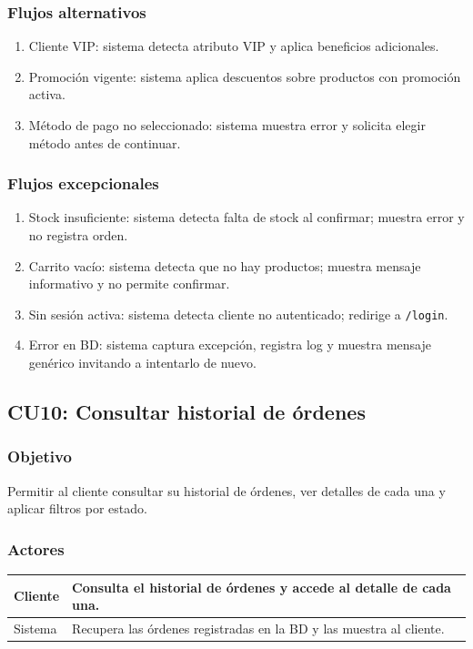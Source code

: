 \documentclass[12pt,a4paper]{article}
\begin{document}
\subsubsection*{Flujos alternativos}
\begin{enumerate}[label=FA-\arabic*]
    \item Cliente VIP: sistema detecta atributo VIP y aplica beneficios adicionales.
    \item Promoción vigente: sistema aplica descuentos sobre productos con promoción activa.
    \item Método de pago no seleccionado: sistema muestra error y solicita elegir método antes de continuar.
\end{enumerate}

\subsubsection*{Flujos excepcionales}
\begin{enumerate}[label=FE-\arabic*]
    \item Stock insuficiente: sistema detecta falta de stock al confirmar; muestra error y no registra orden.
    \item Carrito vacío: sistema detecta que no hay productos; muestra mensaje informativo y no permite confirmar.
    \item Sin sesión activa: sistema detecta cliente no autenticado; redirige a \texttt{/login}.
    \item Error en BD: sistema captura excepción, registra log y muestra mensaje genérico invitando a intentarlo de nuevo.
\end{enumerate}


\subsection{CU10: Consultar historial de órdenes}
\subsubsection*{Objetivo}
Permitir al cliente consultar su historial de órdenes, ver detalles de cada una y aplicar filtros por estado.

\subsubsection*{Actores}
\begin{longtable}{|l|p{10cm}|}
    \hline
    Cliente & Consulta el historial de órdenes y accede al detalle de cada una.   \\ \hline
    Sistema & Recupera las órdenes registradas en la BD y las muestra al cliente. \\ \hline
\end{longtable}
\end{document}
